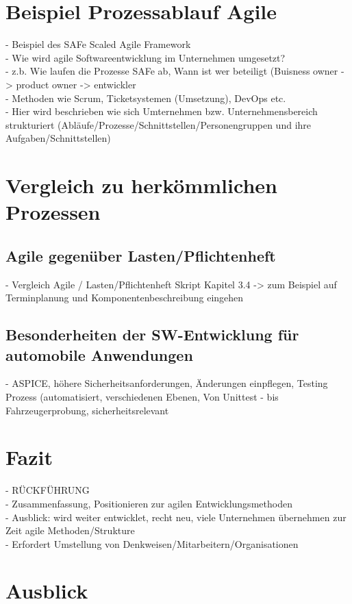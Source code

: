 \section{Beispiel Prozessablauf Agile}
- Beispiel des SAFe Scaled Agile Framework\\ 
- Wie wird agile Softwareentwicklung im Unternehmen umgesetzt? \\
- z.b. Wie laufen die Prozesse SAFe ab, Wann ist wer beteiligt (Buisness owner -> product owner -> entwickler\\
- Methoden wie Scrum, Ticketsystemen (Umsetzung), DevOps etc. \\ 
- Hier wird beschrieben wie sich Umternehmen bzw. Unternehmensbereich strukturiert (Abläufe/Prozesse/Schnittstellen/Personengruppen und ihre Aufgaben/Schnittstellen) \\ 
 
\section{Vergleich zu herkömmlichen Prozessen}\label{vergleich}

\subsection{Agile gegenüber Lasten/Pflichtenheft}
- Vergleich Agile / Lasten/Pflichtenheft Skript Kapitel 3.4 -> zum Beispiel auf Terminplanung und Komponentenbeschreibung eingehen\\

\subsection{Besonderheiten der SW-Entwicklung für automobile Anwendungen}
- ASPICE, höhere Sicherheitsanforderungen, Änderungen einpflegen, Testing Prozess (automatisiert, verschiedenen Ebenen, Von Unittest - bis Fahrzeugerprobung, sicherheitsrelevant\\

\section{Fazit}
- RÜCKFÜHRUNG\\
- Zusammenfassung, Positionieren zur agilen Entwicklungsmethoden \\
- Ausblick: wird weiter entwicklet, recht neu, viele Unternehmen übernehmen zur Zeit agile Methoden/Strukture \\
- Erfordert Umstellung von Denkweisen/Mitarbeitern/Organisationen\\
\section{Ausblick}